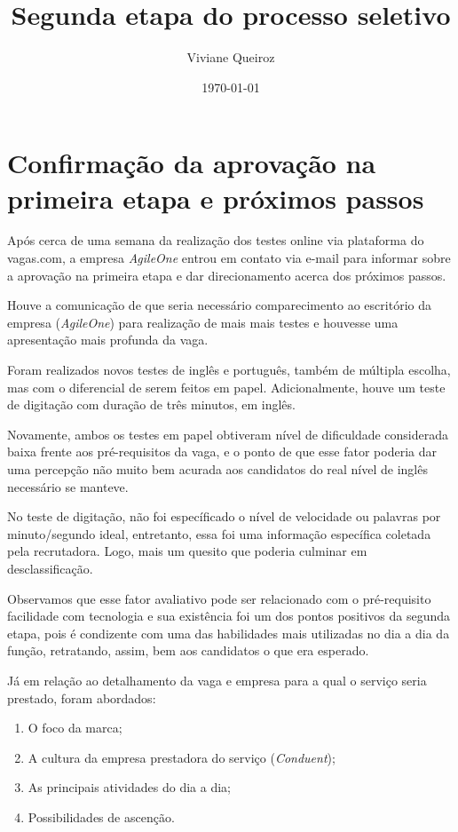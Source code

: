 \documentclass[12pt]{article}
\title{Segunda etapa do processo seletivo}
\author{Viviane Queiroz}
\date{\today}
\begin{document}
\maketitle


\section*{Confirmação da aprovação na primeira etapa e próximos passos}

Após cerca de uma semana da realização dos testes online via plataforma do vagas.com, a empresa \emph {AgileOne} entrou em contato via e-mail para informar sobre a aprovação na primeira etapa e dar direcionamento acerca dos próximos passos. 

Houve a comunicação de que seria necessário comparecimento ao escritório da empresa (\emph {AgileOne}) para realização de mais mais testes e houvesse uma apresentação mais profunda da vaga.

Foram realizados novos testes de inglês e português, também de múltipla escolha, mas com o diferencial de serem feitos em papel. Adicionalmente, houve um teste de digitação com duração de três minutos, em inglês. 

Novamente, ambos os testes em papel obtiveram nível de dificuldade considerada baixa frente aos pré-requisitos da vaga, e o ponto de que esse fator poderia dar uma percepção não muito bem acurada aos candidatos do real nível de inglês necessário se manteve. 

No teste de digitação, não foi específicado o nível de velocidade ou palavras por minuto/segundo ideal, entretanto, essa foi uma informação específica coletada pela recrutadora. Logo, mais um quesito que poderia culminar em desclassificação. 

Observamos que esse fator avaliativo pode ser relacionado com o pré-requisito facilidade com tecnologia e sua existência foi um dos pontos positivos da segunda etapa, pois é condizente com uma das habilidades mais utilizadas no dia a dia da função, retratando, assim, bem aos candidatos o que era esperado. 

Já em relação ao detalhamento da vaga e empresa para a qual o serviço seria prestado, foram abordados: 

\begin{enumerate}
   	\item O foco da marca;
	\item A cultura da empresa prestadora do serviço (\emph{Conduent});
   	\item As principais atividades do dia a dia; 
   	\item Possibilidades de ascenção. 
\end{enumerate}
\end{document}

